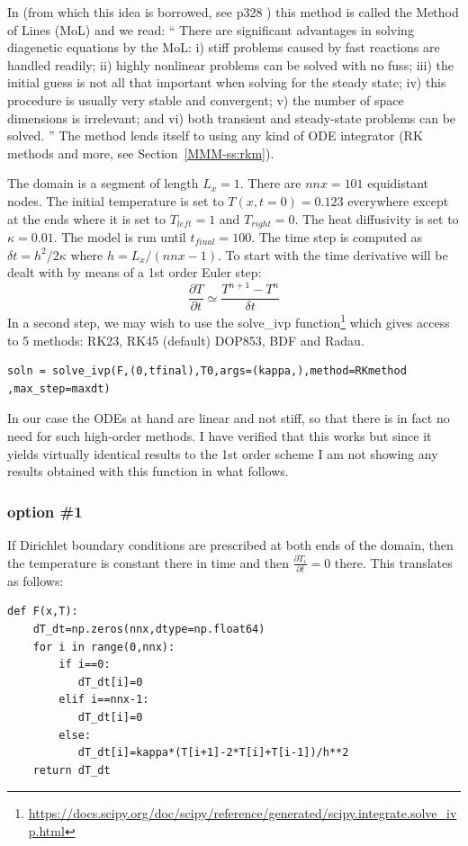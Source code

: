 In \textcite{boudreau} (from which this idea is borrowed, see p328 )
this method is called the Method of Lines (MoL) and we read:
``
There are significant advantages in solving diagenetic equations by the MoL: 
i) stiff problems caused by fast reactions are handled readily; 
ii) highly nonlinear problems can be solved with no fuss; 
iii) the initial guess is not all that important when solving for the steady state; 
iv) this procedure is usually very stable and convergent; 
v) the number of space dimensions is irrelevant; and 
vi) both transient and steady-state problems can be solved.
''
The method lends itself to using any kind of ODE integrator (RK methods and more, 
see Section~\ref{MMM-ss:rkm}).

The domain is a segment of length $L_x=1$. There are $nnx=101$ equidistant nodes. 
The initial temperature is set to $T(x,t=0)=0.123$ everywhere 
except at the ends where it is set to $T_{left}=1$ and $T_{right}=0$.
The heat diffusivity is set to $\kappa=0.01$. The model is run until $t_{final}=100$.
The time step is computed as $\delta t=h^2/2\kappa$ where $h=L_x/(nnx-1)$.
To start with the time derivative will be dealt with by means of a 1st order
Euler step:
\[
\frac{\partial T}{\partial t} \simeq \frac{T^{n+1}-T^n}{\delta t}
\]
In a second step, we may wish to use the {\python solve\_ivp} 
function\footnote{\url{https://docs.scipy.org/doc/scipy/reference/generated/scipy.integrate.solve_ivp.html}}
which gives access to 5 methods: RK23, RK45 (default) DOP853, BDF and Radau.

\begin{lstlisting}
soln = solve_ivp(F,(0,tfinal),T0,args=(kappa,),method=RKmethod ,max_step=maxdt)
\end{lstlisting}

In our case the ODEs at hand are linear and not stiff, so that 
there is in fact no need for such high-order methods.
I have verified that this works but since it yields virtually identical 
results to the 1st order scheme I am not showing any results obtained with this function in what follows.

\subsubsection*{option \#1}

If Dirichlet boundary conditions are prescribed at both ends of the domain, 
then the temperature is constant there in time and then $\frac{\partial T_i}{\partial t}=0$ there.
This translates as follows:
\begin{lstlisting}
def F(x,T):
    dT_dt=np.zeros(nnx,dtype=np.float64)
    for i in range(0,nnx):
        if i==0:
           dT_dt[i]=0
        elif i==nnx-1: 
           dT_dt[i]=0
        else:
           dT_dt[i]=kappa*(T[i+1]-2*T[i]+T[i-1])/h**2
    return dT_dt
\end{lstlisting}

